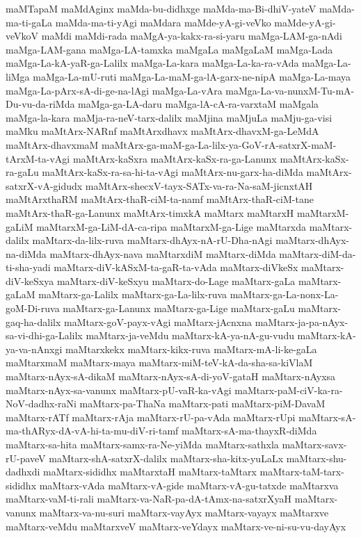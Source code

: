 {maMTapaM
maMdAginx
maMda-bu-didhxge
maMda-ma-Bi-dhiV-yateV
maMda-ma-ti-gaLa
maMda-ma-ti-yAgi
maMdara
maMde-yA-gi-veVko
maMde-yA-gi-veVkoV
maMdi
maMdi-rada
maMgA-ya-kakx-ra-si-yaru
maMga-LAM-ga-nAdi
maMga-LAM-gana
maMga-LA-tamxka
maMgaLa
maMgaLaM
maMga-Lada
maMga-La-kA-yaR-ga-Lalilx
maMga-La-kara
maMga-La-ka-ra-vAda
maMga-La-liMga
maMga-La-mU-ruti
maMga-La-maM-ga-lA-garx-ne-nipA
maMga-La-maya
maMga-La-pArx-sA-di-ge-na-lAgi
maMga-La-vAra
maMga-La-va-nunxM-Tu-mA-Du-vu-da-riMda
maMga-ga-LA-daru
maMga-lA-cA-ra-varxtaM
maMgala
maMga-la-kara
maMja-ra-neV-tarx-dalilx
maMjina
maMjuLa
maMju-ga-visi
maMku
maMtArx-NARnf
maMtArxdhavx
maMtArx-dhavxM-ga-LeMdA
maMtArx-dhavxmaM
maMtArx-ga-maM-ga-La-lilx-ya-GoV-rA-satxrX-maM-tArxM-ta-vAgi
maMtArx-kaSxra
maMtArx-kaSx-ra-ga-Lanunx
maMtArx-kaSx-ra-gaLu
maMtArx-kaSx-ra-sa-hi-ta-vAgi
maMtArx-nu-garx-ha-diMda
maMtArx-satxrX-vA-gidudx
maMtArx-shecxV-tayx-SATx-va-ra-Na-saM-jicnxtAH
maMtArxthaRM
maMtArx-thaR-ciM-ta-namf
maMtArx-thaR-ciM-tane
maMtArx-thaR-ga-Lanunx
maMtArx-timxkA
maMtarx
maMtarxH
maMtarxM-gaLiM
maMtarxM-ga-LiM-dA-ca-ripa
maMtarxM-ga-Lige
maMtarxda
maMtarx-dalilx
maMtarx-da-lilx-ruva
maMtarx-dhAyx-nA-rU-Dha-nAgi
maMtarx-dhAyx-na-diMda
maMtarx-dhAyx-nava
maMtarxdiM
maMtarx-diMda
maMtarx-diM-da-ti-sha-yadi
maMtarx-diV-kASxM-ta-gaR-ta-vAda
maMtarx-diVkeSx
maMtarx-diV-keSxya
maMtarx-diV-keSxyu
maMtarx-do-Lage
maMtarx-gaLa
maMtarx-gaLaM
maMtarx-ga-Lalilx
maMtarx-ga-La-lilx-ruva
maMtarx-ga-La-nonx-La-goM-Di-ruva
maMtarx-ga-Lanunx
maMtarx-ga-Lige
maMtarx-gaLu
maMtarx-gaq-ha-dalilx
maMtarx-goV-payx-vAgi
maMtarx-jAcnxna
maMtarx-ja-pa-nAyx-sa-vi-dhi-ga-Lalilx
maMtarx-ja-veMdu
maMtarx-kA-ya-nA-gu-vudu
maMtarx-kA-ya-va-nAnxgi
maMtarxkekx
maMtarx-kikx-ruva
maMtarx-mA-li-ke-gaLa
maMtarxmaM
maMtarx-maya
maMtarx-miM-teV-kA-da-sha-sa-kiVlaM
maMtarx-nAyx-sA-dikaM
maMtarx-nAyx-sA-di-yoV-gataH
maMtarx-nAyxsa
maMtarx-nAyx-sa-vanunx
maMtarx-pU-vaR-ka-vAgi
maMtarx-paM-ciV-ka-ra-NoV-dadhx-raNi
maMtarx-pa-ThaNa
maMtarx-pati
maMtarx-piM-DavaM
maMtarx-rATf
maMtarx-rAja
maMtarx-rU-pa-vAda
maMtarx-rUpi
maMtarx-sA-ma-thARyx-dA-vA-hi-ta-mu-diV-ri-tamf
maMtarx-sA-ma-thayxR-diMda
maMtarx-sa-hita
maMtarx-samx-ra-Ne-yiMda
maMtarx-sathxla
maMtarx-savx-rU-paveV
maMtarx-shA-satxrX-dalilx
maMtarx-sha-kitx-yuLaLx
maMtarx-shu-dadhxdi
maMtarx-sididhx
maMtarxtaH
maMtarx-taMtarx
maMtarx-taM-tarx-sididhx
maMtarx-vAda
maMtarx-vA-gide
maMtarx-vA-gu-tatxde
maMtarxva
maMtarx-vaM-ti-rali
maMtarx-va-NaR-pa-dA-tAmx-na-satxrXyaH
maMtarx-vanunx
maMtarx-va-nu-suri
maMtarx-vayAyx
maMtarx-vayayx
maMtarxve
maMtarx-veMdu
maMtarxveV
maMtarx-veYdayx
maMtarx-ve-ni-su-vu-dayAyx
}
